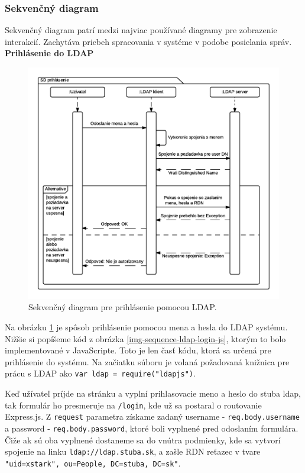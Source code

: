 \subsubsection{Sekvenčný diagram}\label{diagram-sequence-section}
Sekvenčný diagram patrí medzi najviac používané diagramy pre zobrazenie interakcií. Zachytáva priebeh spracovania v systéme v podobe posielania správ.\\


\noindent \textbf{Prihlásenie do LDAP}

\begin{figure}[H]
  \centering
  \includegraphics[scale=0.7]{img/diagrams/sequence-ldap.png}
  \caption{Sekvenčný diagram pre prihlásenie pomocou LDAP.}
  \label{img-sequence-ldap-login}
\end{figure}

Na obrázku \ref{img-sequence-ldap-login} je spôsob prihlásenie pomocou mena a hesla do LDAP systému. Nižšie si popíšeme kód z obrázka \ref{img-sequence-ldap-login-js}, ktorým to bolo implementované v JavaScripte. Toto je len časť kódu, ktorá sa určená pre prihlásenie do systému. Na začiatku súboru je volaná požadovaná knižnica pre prácu s LDAP ako \verb|var ldap = require("ldapjs")|.

Keď užívateľ príjde na stránku a vyplní prihlasovacie meno a heslo do stuba ldap, tak formulár ho presmeruje na \verb|/login|, kde už sa postaral o routovanie Express.js. Z \verb|request| parametra získame zadaný username - \verb|req.body.username| a password - \verb|req.body.password|, ktoré boli vyplnené pred odoslaním formulára. Čiže ak sú oba vyplnené dostaneme sa do vnútra podmienky, kde sa vytvorí spojenie na linku \verb|ldap://ldap.stuba.sk|, a zašle RDN reťazec v tvare \verb|"uid=xstark", ou=People, DC=stuba, DC=sk"|.

